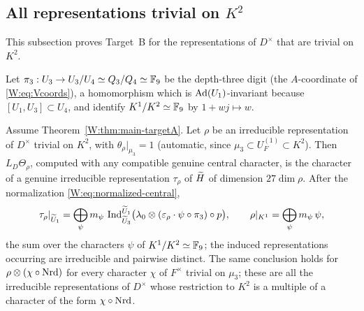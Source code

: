 \subsection{All representations trivial on $K^2$}
This subsection proves Target~B for the representations of $D^\times$ that are trivial on $K^2$.

Let $\pi_3:U_3\to U_3/U_4\simeq Q_3/Q_4\simeq\mathbb F_9$ be the depth-three
digit (the $A$-coordinate of \eqref{W:eq:Vcoords}), a homomorphism which
is $\operatorname{Ad}(U_1)$-invariant because $[U_1,U_3]\subset U_4$, and identify
$K^1/K^2\simeq\mathbb F_9$ by $1+wj\mapsto w$.

\begin{theorem}\label{W:thm:levelone}
Assume Theorem~\ref{W:thm:main-targetA}.  Let $\rho$ be an irreducible
representation of $D^\times$ trivial on $K^2$, with
$\theta_\rho|_{\mu_3}=1$ (automatic, since $\mu_3\subset U_F^{(1)}\subset K^2$).
Then $L_D\Theta_\rho$, computed with any compatible genuine central
character, is the character of a genuine irreducible representation
$\tau_\rho$ of $\widetilde H$ of dimension $27\dim\rho$.  After the normalization
\eqref{W:eq:normalized-central},
\[
 \tau_\rho|_{\widetilde U_1}=\bigoplus_{\psi}m_\psi\,\operatorname{Ind}_{\widetilde U_3}^{\widetilde U_1}\bigl(\lambda_0\otimes(\varepsilon_\rho\cdot\psi\circ\pi_3)\circ p\bigr),
 \qquad \rho|_{K^1}=\bigoplus_\psi m_\psi\,\psi ,
\]
the sum over the characters $\psi$ of $K^1/K^2\simeq\mathbb F_9$; the
induced representations occurring are irreducible and pairwise
distinct.
The same conclusion holds for $\rho\otimes(\chi\circ\operatorname{Nrd})$ for every
character $\chi$ of $F^\times$ trivial on $\mu_3$; these are all the
irreducible representations of $D^\times$ whose restriction to $K^2$
is a multiple of a character of the form $\chi\circ\operatorname{Nrd}$.
\end{theorem}
